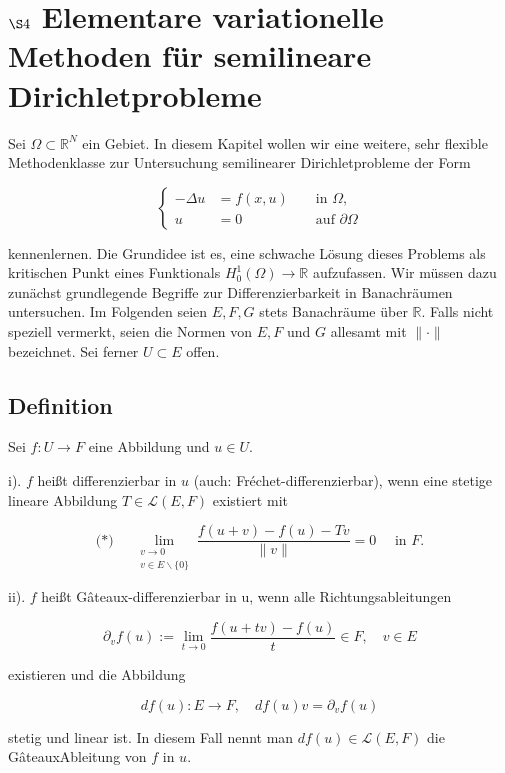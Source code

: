 \documentclass[10pt, letterpaper]{article}
\begin{document}
\section*{$\S 4$ Elementare variationelle Methoden für semilineare Dirichletprobleme}

Sei $\Omega \subset \mathbb{R}^{N}$ ein Gebiet. In diesem Kapitel wollen wir eine weitere, sehr flexible Methodenklasse zur Untersuchung semilinearer Dirichletprobleme der Form

$$
\left\{\begin{aligned}
-\Delta u & =f(x, u) & & \text { in } \Omega, \\
u & =0 & & \text { auf } \partial \Omega
\end{aligned}\right.
$$

kennenlernen. Die Grundidee ist es, eine schwache Lösung dieses Problems als kritischen Punkt eines Funktionals $H_{0}^{1}(\Omega) \rightarrow \mathbb{R}$ aufzufassen. Wir müssen dazu zunächst grundlegende Begriffe zur Differenzierbarkeit in Banachräumen untersuchen. Im Folgenden seien $E, F, G$ stets Banachräume über $\mathbb{R}$. Falls nicht speziell vermerkt, seien die Normen von $E, F$ und $G$ allesamt mit $\|\cdot\|$ bezeichnet. Sei ferner $U \subset E$ offen.

\subsection*{Definition}

Sei $f: U \rightarrow F$ eine Abbildung und $u \in U$.

i). $f$ heißt differenzierbar in $u$ (auch: Fréchet-differenzierbar), wenn eine stetige lineare Abbildung $T \in \mathcal{L}(E, F)$ existiert mit

$$
\text { (*) } \quad \lim _{\substack{v \rightarrow 0 \\ v \in E \backslash\{0\}}} \frac{f(u+v)-f(u)-T v}{\|v\|}=0 \quad \text { in } F \text {. }
$$

ii). $f$ heißt Gâteaux-differenzierbar in u, wenn alle Richtungsableitungen

$$
\partial_{v} f(u):=\lim _{t \rightarrow 0} \frac{f(u+t v)-f(u)}{t} \in F, \quad v \in E
$$

existieren und die Abbildung

$$
d f(u): E \rightarrow F, \quad d f(u) v=\partial_{v} f(u)
$$

stetig und linear ist. In diesem Fall nennt man $d f(u) \in \mathcal{L}(E, F)$ die GâteauxAbleitung von $f$ in $u$.
\end{document}
